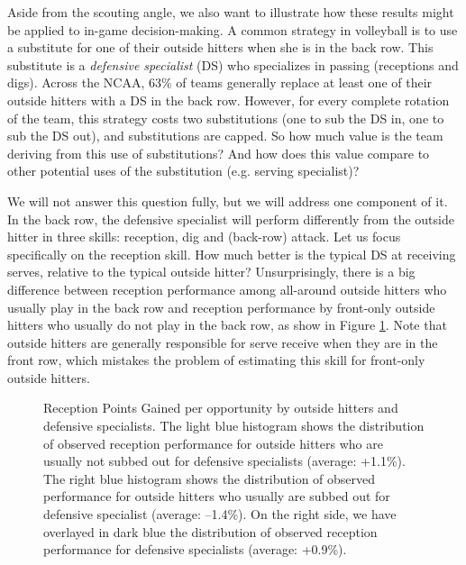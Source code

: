 \documentclass[USenglish]{article}
\theoremstyle{dgthm}
\theoremstyle{dgdef}
\begin{document}
Aside from the scouting angle, we also want to illustrate how these results might be applied to in-game decision-making. A common strategy in volleyball is to use a substitute for one of their outside hitters when she is in the back row. This substitute is a {\it defensive specialist} (DS) who specializes in passing (receptions and digs). Across the NCAA, 63\% of teams generally replace at least one of their outside hitters with a DS in the back row. However, for every complete rotation of the team, this strategy costs two substitutions (one to sub the DS in, one to sub the DS out), and substitutions are capped. So how much value is the team deriving from this use of substitutions? And how does this value compare to other potential uses of the substitution (e.g. serving specialist)?

We will not answer this question fully, but we will address one component of it. In the back row, the defensive specialist will perform differently from the outside hitter in three skills: reception, dig and (back-row) attack. Let us focus specifically on the reception skill. How much better is the typical DS at receiving serves, relative to the typical outside hitter? Unsurprisingly, there is a big difference between reception performance among all-around outside hitters who usually play in the back row and reception performance by front-only outside hitters who usually do not play in the back row, as show in Figure \ref{fig:oh-comparison}. Note that outside hitters are generally responsible for serve receive when they are in the front row, which mistakes the problem of estimating this skill for front-only outside hitters.

\begin{figure}
    \centering
    \caption{Reception Points Gained per opportunity by outside hitters and defensive specialists. The light blue histogram shows the distribution of observed reception performance for outside hitters who are usually not subbed out for defensive specialists (average: +1.1\%). The right blue histogram shows the distribution of observed performance for outside hitters who usually are subbed out for defensive specialist (average: --1.4\%). On the right side, we have overlayed in dark blue the distribution of observed reception performance for defensive specialists (average: +0.9\%).}
    \label{fig:oh-comparison}
\end{figure}
\end{document}
